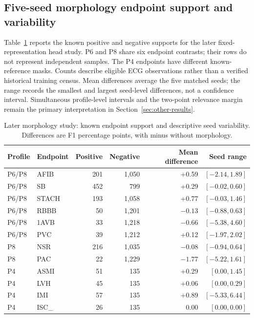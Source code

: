 \subsection{Five-seed morphology endpoint support and variability}
\label{sec:app-morph-support}
Table~\ref{tab:app-morph-support} reports the known positive and negative supports for the later fixed-representation head study. P6 and P8 share six endpoint contrasts; their rows do not represent independent samples. The P4 endpoints have different known-reference masks. Counts describe eligible ECG observations rather than a verified historical training census. Mean differences average the five matched seeds; the range records the smallest and largest seed-level differences, not a confidence interval. Simultaneous profile-level intervals and the two-point relevance margin remain the primary interpretation in Section~\ref{sec:other-results}.

\begin{table}[tbp]
\caption{Later morphology study: known endpoint support and descriptive seed variability. Differences are F1 percentage points, with minus without morphology.\label{tab:app-morph-support}}
\centering\small
\begin{tabular}{@{}llrrrr@{}}
\toprule
Profile & Endpoint & Positive & Negative & Mean difference & Seed range \\
\midrule
P6/P8 & AFIB & 201 & 1,050 & +0.59 & $[-2.14,1.89]$ \\
P6/P8 & SB & 452 & 799 & +0.29 & $[-0.02,0.60]$ \\
P6/P8 & STACH & 193 & 1,058 & +0.77 & $[-0.03,1.46]$ \\
P6/P8 & RBBB & 50 & 1,201 & $-0.13$ & $[-0.88,0.63]$ \\
P6/P8 & 1AVB & 33 & 1,218 & $-0.66$ & $[-5.38,4.60]$ \\
P6/P8 & PVC & 39 & 1,212 & +0.12 & $[-1.97,2.02]$ \\
P8 & NSR & 216 & 1,035 & $-0.08$ & $[-0.94,0.64]$ \\
P8 & PAC & 22 & 1,229 & $-1.77$ & $[-5.22,1.61]$ \\
P4 & ASMI & 51 & 135 & +0.29 & $[0.00,1.45]$ \\
P4 & LVH & 45 & 135 & +0.06 & $[0.00,0.29]$ \\
P4 & IMI & 57 & 135 & +0.89 & $[-5.33,6.44]$ \\
P4 & ISC\_ & 26 & 135 & 0.00 & $[0.00,0.00]$ \\
\bottomrule
\end{tabular}
\end{table}
